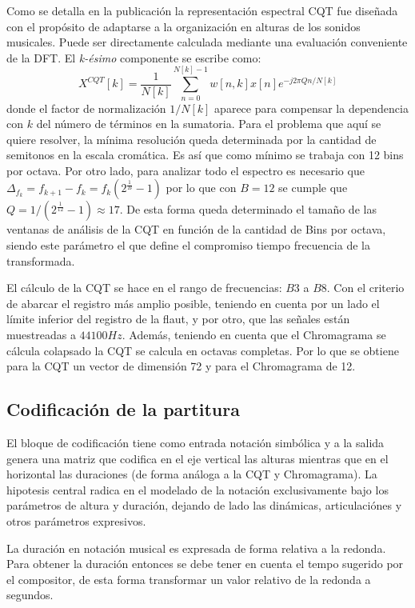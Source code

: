 \documentclass
  [ams,pdfout]%
	{aeslac}
\begin{document}
Como se detalla en la publicación \cite{brown1991calculation} la representación espectral CQT fue diseñada con el propósito de adaptarse a la organización en alturas de los sonidos musicales. Puede ser directamente calculada mediante una evaluación conveniente de la DFT. El \textit{k-ésimo} componente se escribe como: 
\begin{equation}
\label{eq:CQT}
X^{CQT}[k]=\frac{1}{N[k]}\sum_{n=0}^{N[k]-1}w[n,k]x[n]e^{-j2\pi Qn/N[k]}
\end{equation}
donde el factor de normalización $1/N[k]$ aparece para compensar la dependencia con $k$ del número de términos en la sumatoria. Para el problema que aquí se quiere resolver, la mínima resolución queda determinada por la cantidad de semitonos en la escala cromática. Es así que como mínimo se trabaja con 12 bins por octava. Por otro lado, para analizar todo el espectro es necesario que $\Delta_{f_k}=f_{k+1}-f_{k}=f_k(2^{\frac{1}{B}}-1)$ por lo que con $B=12$ se cumple que $Q=1/(2^{\frac{1}{12}}-1)\approx 17$. De esta forma queda determinado el tamaño de las ventanas de análisis de la CQT en función de la cantidad de Bins por octava, siendo este parámetro el que define el compromiso tiempo frecuencia de la transformada. 
 
El cálculo de la CQT se hace en el rango de frecuencias: $B3$ a $B8$. Con el criterio de abarcar el registro más amplio posible, teniendo en cuenta por un lado el límite inferior del registro de la flaut, y por otro, que las señales están muestreadas a $44100Hz$. Además, teniendo en cuenta que el Chromagrama se cálcula colapsado la CQT se calcula en octavas completas. Por lo que se obtiene para la CQT un vector de dimensión 72 y para el Chromagrama de 12.

\subsection{Codificación de la partitura}

El bloque de codificación tiene como entrada notación simbólica y a la salida genera una matriz que codifica en el eje vertical las alturas mientras que en el horizontal las duraciones (de forma análoga a la CQT y Chromagrama). La hipotesis central radica en el modelado de la notación exclusivamente bajo los parámetros de altura y duración, dejando de lado las dinámicas, articulaciónes y otros parámetros expresivos. 

La duración en notación musical es expresada de forma relativa a la redonda. Para obtener la duración entonces se debe tener en cuenta el tempo sugerido por el compositor, de esta forma transformar un valor relativo de la redonda a segundos.  
\end{document}
